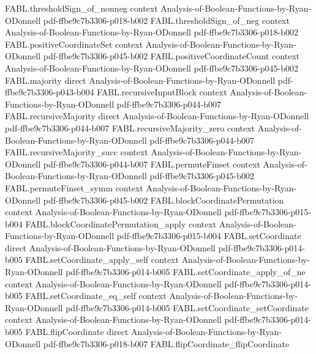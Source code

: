 \begin{theorem}
  {FABL.thresholdSign_of_nonneg}
  {context}
  {Analysis-of-Boolean-Functions-by-Ryan-ODonnell}
  {pdf-ffbe9c7b3306-p018-b002}
\proofstep
  {FABL.thresholdSign_of_neg}
  {context}
  {Analysis-of-Boolean-Functions-by-Ryan-ODonnell}
  {pdf-ffbe9c7b3306-p018-b002}
\proofstep
  {FABL.positiveCoordinateSet}
  {context}
  {Analysis-of-Boolean-Functions-by-Ryan-ODonnell}
  {pdf-ffbe9c7b3306-p045-b002}
\proofstep
  {FABL.positiveCoordinateCount}
  {context}
  {Analysis-of-Boolean-Functions-by-Ryan-ODonnell}
  {pdf-ffbe9c7b3306-p045-b002}
\proofstep
  {FABL.majority}
  {direct}
  {Analysis-of-Boolean-Functions-by-Ryan-ODonnell}
  {pdf-ffbe9c7b3306-p043-b004}
\proofstep
  {FABL.recursiveInputBlock}
  {context}
  {Analysis-of-Boolean-Functions-by-Ryan-ODonnell}
  {pdf-ffbe9c7b3306-p044-b007}
\proofstep
  {FABL.recursiveMajority}
  {direct}
  {Analysis-of-Boolean-Functions-by-Ryan-ODonnell}
  {pdf-ffbe9c7b3306-p044-b007}
\proofstep
  {FABL.recursiveMajority_zero}
  {context}
  {Analysis-of-Boolean-Functions-by-Ryan-ODonnell}
  {pdf-ffbe9c7b3306-p044-b007}
\proofstep
  {FABL.recursiveMajority_succ}
  {context}
  {Analysis-of-Boolean-Functions-by-Ryan-ODonnell}
  {pdf-ffbe9c7b3306-p044-b007}
\proofstep
  {FABL.permuteFinset}
  {context}
  {Analysis-of-Boolean-Functions-by-Ryan-ODonnell}
  {pdf-ffbe9c7b3306-p045-b002}
\proofstep
  {FABL.permuteFinset_symm}
  {context}
  {Analysis-of-Boolean-Functions-by-Ryan-ODonnell}
  {pdf-ffbe9c7b3306-p045-b002}
\proofstep
  {FABL.blockCoordinatePermutation}
  {context}
  {Analysis-of-Boolean-Functions-by-Ryan-ODonnell}
  {pdf-ffbe9c7b3306-p015-b004}
\proofstep
  {FABL.blockCoordinatePermutation_apply}
  {context}
  {Analysis-of-Boolean-Functions-by-Ryan-ODonnell}
  {pdf-ffbe9c7b3306-p015-b004}
\proofstep
  {FABL.setCoordinate}
  {direct}
  {Analysis-of-Boolean-Functions-by-Ryan-ODonnell}
  {pdf-ffbe9c7b3306-p014-b005}
\proofstep
  {FABL.setCoordinate_apply_self}
  {context}
  {Analysis-of-Boolean-Functions-by-Ryan-ODonnell}
  {pdf-ffbe9c7b3306-p014-b005}
\proofstep
  {FABL.setCoordinate_apply_of_ne}
  {context}
  {Analysis-of-Boolean-Functions-by-Ryan-ODonnell}
  {pdf-ffbe9c7b3306-p014-b005}
\proofstep
  {FABL.setCoordinate_eq_self}
  {context}
  {Analysis-of-Boolean-Functions-by-Ryan-ODonnell}
  {pdf-ffbe9c7b3306-p014-b005}
\proofstep
  {FABL.setCoordinate_setCoordinate}
  {context}
  {Analysis-of-Boolean-Functions-by-Ryan-ODonnell}
  {pdf-ffbe9c7b3306-p014-b005}
\proofstep
  {FABL.flipCoordinate}
  {direct}
  {Analysis-of-Boolean-Functions-by-Ryan-ODonnell}
  {pdf-ffbe9c7b3306-p018-b007}
\proofstep
  {FABL.flipCoordinate_flipCoordinate}

\end{theorem}
